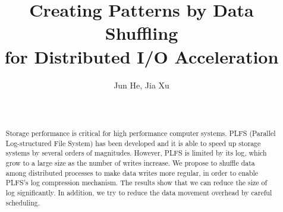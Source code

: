 \documentclass{acm_proc_article-sp}
\begin{document}
\title{Creating Patterns by Data Shuffling \\for Distributed I/O Acceleration
}

%
%
%
%
%

%
\author{
\alignauthor
Jun He, Jia Xu\\
       \\
       \\
}

\maketitle
\begin{abstract}
Storage performance is critical for high
performance computer systems. PLFS (Parallel
Log-structured File System) has been developed
and it is able to speed up storage systems by
several orders of magnitudes. However, PLFS
is limited by its log, which grow to a
large size as the number of writes increase.
We propose to shuffle data among distributed
processes to make data writes more regular,
in order to enable PLFS's log compression
mechanism. The results show that we can reduce
the size of log significantly. In addition,
we try to reduce the data movement overhead
by careful scheduling.
\end{abstract}
\end{document}
